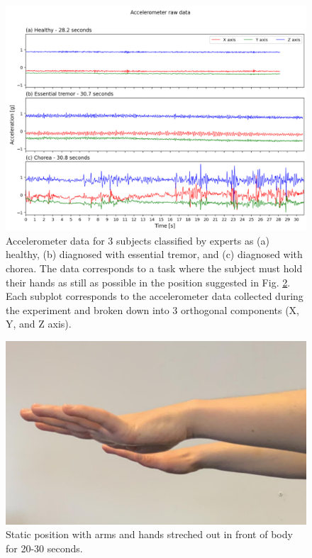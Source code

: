 \begin{figure}[ht]
\centering
\includegraphics[width=\linewidth]{figures/nemo/acc2.png}
\caption{Accelerometer data for 3 subjects classified by experts as (a) healthy, (b) diagnosed with essential tremor, and (c) diagnosed with chorea. The data corresponds to a task where the subject must hold their hands as still as possible in the position suggested in Fig. \ref{fig:hands}.
Each subplot corresponds to the accelerometer data collected during the experiment and broken down into 3 orthogonal components (X, Y, and Z axis). }
\label{fig:acc}
\end{figure}


\begin{figure}[ht]
\centering
\includegraphics[width=.5\linewidth]{figures/nemo/hands.png}
\caption{Static position with arms and hands streched out in front of body for 20-30 seconds.}
\label{fig:hands}
\end{figure}



